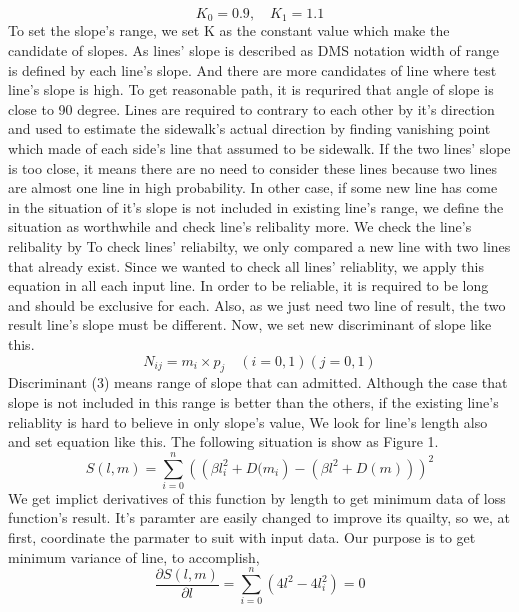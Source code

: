 \documentclass[a4class]{article}
\begin{document}
\begin{equation}{K}_{0} = 0.9,\quad{K}_{1} = 1.1\end{equation} 
To set the slope's range, we set K as the constant value which make the candidate of slopes. As lines' slope is described as DMS notation width of range is defined by each line's slope. And there are more candidates of line where test line's slope is high. To get reasonable path, it is requrired that angle of slope is close to 90 degree. Lines are required to contrary to each other by it's direction and used to estimate the sidewalk's actual direction by finding vanishing point which made of each side's line that assumed to be sidewalk. 
\newline If the two lines’ slope is too close, it means there are no need to consider these lines because two lines are almost one line in high probability. In other case, if some new line has come in the situation of it's slope is not included in existing line's range, we define the situation as worthwhile and check line's relibality more. We check the line's relibality by To check lines’ reliabilty, we only compared a new line with two lines that already exist. Since we wanted to check all lines’ reliablity, we apply this equation in all each input line. \newline
In order to be reliable, it is required to be long and should be exclusive for each. Also, as we just need two line of result, the two result line's slope must be different. Now, we set new discriminant of slope like this. 
\begin{equation}
{N}_{ij} = {m}_{i} \times {p}_{j} \quad (i=0,1)(j=0,1)
\end{equation}
Discriminant (3) means range of slope that can admitted. Although the case that slope is not included in this range is better than the others, if the existing line's reliablity is hard to believe in only slope's value, We look for line's length also and set equation like this. The following situation is show as Figure 1. 
\begin{equation}
\mathit{S\left(l,m\right) = \sum_{i=0}^{n}{(\left(\beta{l}_{i}^{2} + D({m}_{i}\right) - (\beta{l}^{2} + D\left(m \right)))}^{2}}
\end{equation}
We get implict derivatives of this function by length to get minimum data of loss function's result. It's paramter are easily changed to improve its quailty, so we, at first, coordinate the parmater to suit with input data. Our purpose is to get minimum variance of line, to accomplish,  
\begin{equation}
\mathit{\frac{\partial S\left(l,m\right)}{\partial l} = \sum_{i=0}^{n}{\left(4{l}^{2}-4{{l}_{i}^{2}}\right)} = 0} 
\end{equation}
\end{document}
